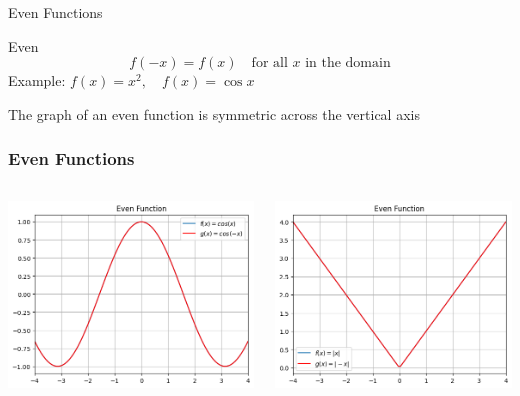 \documentclass{beamer}
\begin{document}
\begin{frame}{Even Functions}
    
\begin{block}{Even}
        \[
        f(-x) = f(x) \quad \text{for all } x \text{ in the domain}
        \]
        Example: \( f(x) = x^2, \quad f(x) = \cos x \)
\end{block}
The graph of an even function is symmetric across the vertical axis 
\end{frame}
\begin{frame}
  \frametitle{Even Functions}
  \begin{columns}
    \includegraphics[width=\linewidth]{even.png}

    \centering
    \includegraphics[width=\linewidth]{even2.png}

\end{columns}

\end{frame}
\end{document}
